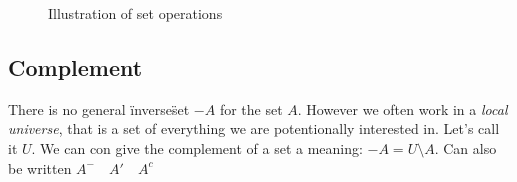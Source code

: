 \documentclass[12pt]{article} %
\begin{document}
\begin{figure}[H] %
\caption{Illustration of set operations}
\label{operations}
\end{figure}

\subsection{Complement}
There is no general \"inverse\" set $-A$ for the set $A$. However we often work in a \textit{local universe}, that is a set of everything we are potentionally interested in. Let's call it $U$. We can con give the complement of a set a meaning: $-A = U \setminus A$. Can also be written $A^- \quad A' \quad A^c$
\end{document}
